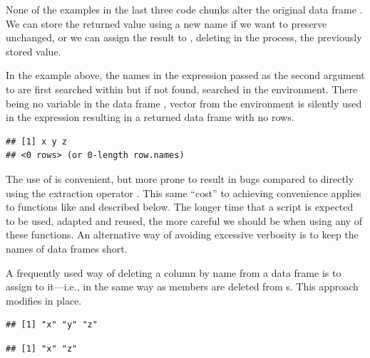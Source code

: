 \documentclass[krantz2]{krantz}\usepackage{knitr}
\begin{document}
None of the examples in the last three code chunks alter the original data frame . We can store the returned value using a new name if we want to preserve  unchanged, or we can assign the result to , deleting in the process, the previously stored value.
\begin{warningbox}
  In the example above, the names in the expression passed as the second argument to  are first searched within  but if not found, searched in the environment. There being no variable  in the data frame , vector  from the environment is silently used in the expression resulting in a returned data frame with no rows.

\begin{knitrout}\footnotesize
{}\color{fgcolor}\begin{kframe}
\begin{alltt}
 \hlkwb{<-} 
 \hlopt{>} \hlstd{)}
\end{alltt}
\begin{verbatim}
## [1] x y z
## <0 rows> (or 0-length row.names)
\end{verbatim}
\end{kframe}
\end{knitrout}

The use of  is convenient, but more prone to result in bugs compared to directly using the extraction operator \code{[]}. This same ``cost'' to achieving convenience applies to functions like  and  described below. The longer time that a script is expected to be used, adapted and reused, the more careful we should be when using any of these functions. An alternative way of avoiding excessive verbosity is to keep the names of data frames short.
\end{warningbox}

A frequently used way of deleting a column by name from a data frame is to assign  to it---i.e., in the same way as members are deleted from s. This approach modifies  in place.

\begin{knitrout}\footnotesize
{}\color{fgcolor}\begin{kframe}
\begin{alltt}
 \hlkwb{<-} 
\end{alltt}
\begin{verbatim}
## [1] "x" "y" "z"
\end{verbatim}
\begin{alltt}
\hlstd{aa.df[[}\hlstd{]]} \hlkwb{<-} 
\end{alltt}
\begin{verbatim}
## [1] "x" "z"
\end{verbatim}
\end{kframe}
\end{knitrout}
\end{document}
